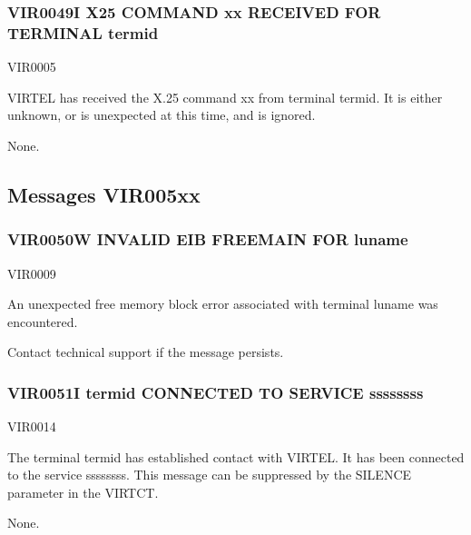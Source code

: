 \documentclass[letterpaper,10pt,english]{sphinxmanual}
\begin{document}
\subsubsection{VIR0049I X25 COMMAND xx RECEIVED FOR TERMINAL termid}
\label{\detokenize{messages:vir0049i-x25-command-xx-received-for-terminal-termid}}\begin{description}
\sphinxAtStartPar
VIR0005

\sphinxAtStartPar
VIRTEL has received the X.25 command xx from terminal termid. It is either unknown, or is unexpected at this time, and is ignored.

\sphinxAtStartPar
None.

\end{description}


\subsection{Messages VIR005xx}
\label{\detokenize{messages:messages-vir005xx}}

\subsubsection{VIR0050W INVALID EIB FREEMAIN FOR luname}
\label{\detokenize{messages:vir0050w-invalid-eib-freemain-for-luname}}\begin{description}
\sphinxAtStartPar
VIR0009

\sphinxAtStartPar
An unexpected free memory block error associated with terminal luname was encountered.

\sphinxAtStartPar
Contact technical support if the message persists.

\end{description}


\subsubsection{VIR0051I termid CONNECTED TO SERVICE ssssssss}
\label{\detokenize{messages:vir0051i-termid-connected-to-service-ssssssss}}\begin{description}
\sphinxAtStartPar
VIR0014

\sphinxAtStartPar
The terminal termid has established contact with VIRTEL. It has been connected to the service ssssssss. This message can be suppressed by the SILENCE parameter in the VIRTCT.

\sphinxAtStartPar
None.

\end{description}
\end{document}
